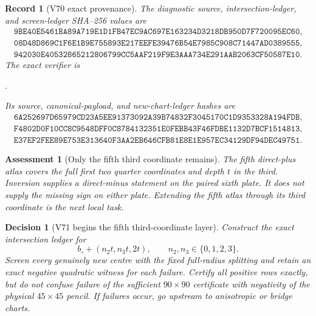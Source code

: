 \documentclass[11pt,oneside]{article}
\newtheorem{assessment}[theorem]{Assessment}
\newtheorem{record}[theorem]{Record}
\newtheorem{decision}[theorem]{Decision}
\theoremstyle{definition}
\theoremstyle{remark}
\begin{document}
\begin{record}[V70 exact provenance]
\label{rec:newv70-provenance}
The diagnostic source, intersection-ledger, and screen-ledger
SHA--256 values are
\[
\begin{gathered}
\texttt{9BE40E5461BA89A719E1D1FB47EC9AC697E163234D3218DB950D7F720095EC60},\\
\texttt{08D48D869C1F6E1B9E755893E217EEFE39476B54E7985C908C71447AD0389555},\\
\texttt{942030E40532865212806799CC5AAF219F9E3AAA734E291AAB2063CF50587E10}.
\end{gathered}                                        \tag{70.13}
\]
The exact verifier is
\begin{center}
\footnotesize
{}.
\end{center}
Its source, canonical-payload, and new-chart-ledger hashes are
\[
\begin{gathered}
\texttt{6A252697D65979CD23A5EE91373092A39B74832F3045170C1D9353328A194FDB},\\
\texttt{F4802D0F10CC8C9548DFF0C8784132351E0FEBB43F46FDBE1132D7BCF1514813},\\
\texttt{E37EF2FEE89E753E313640F3AA2EB646CFB81E8E1E957EC34129DF94DEC49751}.
\end{gathered}                                        \tag{70.14}
\]
\end{record}

\begin{assessment}[Only the fifth third coordinate remains]
\label{ass:newv70}
The fifth direct-plus atlas covers the full first two quarter
coordinates and depth \(t\) in the third.  Inversion supplies a
direct-minus statement on the paired sixth plate.  It does not
supply the missing sign on either plate.  Extending the fifth atlas
through its third coordinate is the next local task.
\end{assessment}

\begin{decision}[V71 begins the fifth third-coordinate layer]
\label{dec:newv70-next}
Construct the exact intersection ledger for
\[
 b_\circ+(n_2t,n_3t,2t),\qquad n_2,n_3\in\{0,1,2,3\}. \tag{70.15}
\]
Screen every genuinely new centre with the fixed full-radius
splitting and retain an exact negative quadratic witness for each
failure.  Certify all positive rows exactly, but do not confuse
failure of the sufficient \(90\times90\) certificate with
negativity of the physical \(45\times45\) pencil.  If failures
occur, go upstream to anisotropic or bridge charts.
\end{decision}
\end{document}

